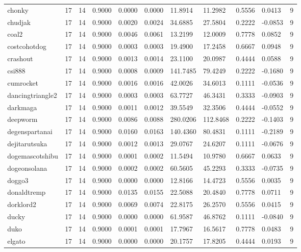 \begin{table}[htbp]
\begin{tabular}{lllllllllll}
chonky & 17 & 14 & 0.9000 & 0.0000 & 0.0000 & 11.8914 & 11.2982 & 0.5556 & 0.0413 & 9 \\
chudjak & 17 & 14 & 0.9000 & 0.0020 & 0.0024 & 34.6885 & 27.5804 & 0.2222 & -0.0853 & 9 \\
coal2 & 17 & 14 & 0.9000 & 0.0046 & 0.0061 & 13.2199 & 12.0009 & 0.7778 & 0.0852 & 9 \\
costcohotdog & 17 & 14 & 0.9000 & 0.0003 & 0.0003 & 19.4900 & 17.2458 & 0.6667 & 0.0948 & 9 \\
crashout & 17 & 14 & 0.9000 & 0.0013 & 0.0014 & 23.1100 & 20.0987 & 0.4444 & 0.0588 & 9 \\
csi888 & 17 & 14 & 0.9000 & 0.0008 & 0.0009 & 141.7485 & 79.4249 & 0.2222 & -0.1680 & 9 \\
cumrocket & 17 & 14 & 0.9000 & 0.0016 & 0.0016 & 42.0026 & 34.6013 & 0.1111 & -0.0536 & 9 \\
dancingtriangle2 & 17 & 14 & 0.9000 & 0.0003 & 0.0003 & 63.7727 & 46.3431 & 0.3333 & -0.0903 & 9 \\
darkmaga & 17 & 14 & 0.9000 & 0.0011 & 0.0012 & 39.5549 & 32.3506 & 0.4444 & -0.0552 & 9 \\
deepworm & 17 & 14 & 0.9000 & 0.0086 & 0.0088 & 280.0206 & 112.8468 & 0.2222 & -0.1403 & 9 \\
degenspartanai & 17 & 14 & 0.9000 & 0.0160 & 0.0163 & 140.4360 & 80.4831 & 0.1111 & -0.2189 & 9 \\
dejitarutsuka & 17 & 14 & 0.9000 & 0.0012 & 0.0013 & 29.0767 & 24.6207 & 0.1111 & -0.0676 & 9 \\
dogemascotshibu & 17 & 14 & 0.9000 & 0.0001 & 0.0002 & 11.5494 & 10.9780 & 0.6667 & 0.0633 & 9 \\
dogeonsolana & 17 & 14 & 0.9000 & 0.0002 & 0.0002 & 60.5605 & 45.2293 & 0.3333 & -0.0735 & 9 \\
doggo3 & 17 & 14 & 0.9000 & 0.0000 & 0.0000 & 12.8166 & 14.4723 & 0.5556 & 0.0035 & 9 \\
donaldtremp & 17 & 14 & 0.9000 & 0.0135 & 0.0155 & 22.5088 & 20.4840 & 0.7778 & 0.0711 & 9 \\
dorklord2 & 17 & 14 & 0.9000 & 0.0069 & 0.0074 & 22.8175 & 26.2570 & 0.5556 & 0.0415 & 9 \\
ducky & 17 & 14 & 0.9000 & 0.0000 & 0.0000 & 61.9587 & 46.8762 & 0.1111 & -0.0840 & 9 \\
duko & 17 & 14 & 0.9000 & 0.0001 & 0.0001 & 17.7967 & 16.5617 & 0.7778 & 0.0483 & 9 \\
elgato & 17 & 14 & 0.9000 & 0.0000 & 0.0000 & 20.1757 & 17.8205 & 0.4444 & 0.0193 & 9 \\

\end{tabular}
\end{table}
